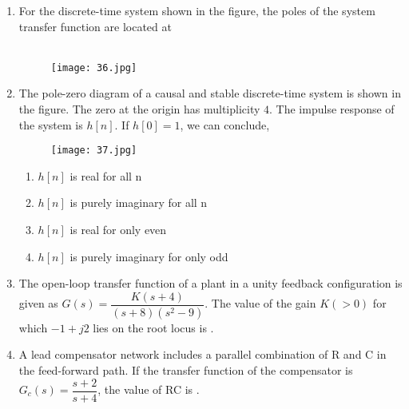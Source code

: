 \documentclass[12pt,-letter paper]{article}
\providecommand{\sbrak}[1]{\ensuremath{{}\left[#1\right]}}
\providecommand{\brak}[1]{\ensuremath{\left(#1\right)}}
\theoremstyle{remark}
\begin{document}
\begin{enumerate}
 \item For the discrete-time system shown in the figure, the poles of the system transfer function are located at  \\ \\
    \begin{figure}[H]
        \centering
        \texttt{[image: 36.jpg]}
    \end{figure}
 \item The pole-zero diagram of a causal and stable discrete-time system is shown in the figure. The zero at the origin has multiplicity $4$. The impulse response of the system is $h\sbrak{n}$. If $h\sbrak{0}=1$, we can conclude,
     \begin{figure}[H]
        \centering
        \texttt{[image: 37.jpg]}
    \end{figure}
    \begin{enumerate}
        \item $h\sbrak{n}$ is real for all n
        \item $h\sbrak{n}$ is purely imaginary for all n
        \item $h\sbrak{n}$ is real for only even 
        \item $h\sbrak{n}$ is purely imaginary for only odd 
    \end{enumerate}

 \item The open-loop transfer function of a plant in a unity feedback configuration is given as $G\brak{s}=\dfrac{K\brak{s+4}}{\brak{s+8}\brak{s^2-9}}$. The value of the gain $K\brak{>0}$ for which $-1+j2$ lies on the root locus is \underline{\hspace{1cm}}.

 \item A lead compensator network includes a parallel combination of R and C in the feed-forward path. If the transfer function of the compensator is  $G_c\brak{s}=\dfrac{s+2}{s+4}$, the value of RC is \underline{\hspace{1cm}}.


\end{enumerate}
\end{document}
